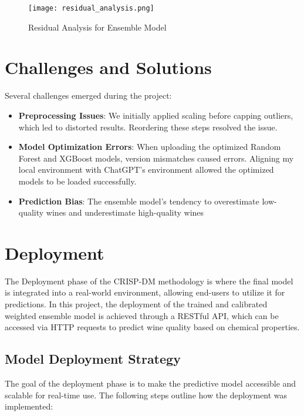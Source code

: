 \documentclass{article}
\begin{document}
\begin{figure}[h]
    \centering
    \texttt{[image: residual\_analysis.png]}
    \caption{Residual Analysis for Ensemble Model}
\end{figure}

\section{Challenges and Solutions}
Several challenges emerged during the project:
\begin{itemize}
    \item \textbf{Preprocessing Issues}: We initially applied scaling before capping outliers, which led to distorted results. Reordering these steps resolved the issue.
    \item \textbf{Model Optimization Errors}: When uploading the optimized Random Forest and XGBoost models, version mismatches caused errors. Aligning my local environment with ChatGPT’s environment allowed the optimized models to be loaded successfully.
    \item \textbf{Prediction Bias}: The ensemble model’s tendency to overestimate low-quality wines and underestimate high-quality wines
\end{itemize}

\section{Deployment}

The Deployment phase of the CRISP-DM methodology is where the final model is integrated into a real-world environment, allowing end-users to utilize it for predictions. In this project, the deployment of the trained and calibrated weighted ensemble model is achieved through a RESTful API, which can be accessed via HTTP requests to predict wine quality based on chemical properties.

\subsection{Model Deployment Strategy}
The goal of the deployment phase is to make the predictive model accessible and scalable for real-time use. The following steps outline how the deployment was implemented:
\end{document}
